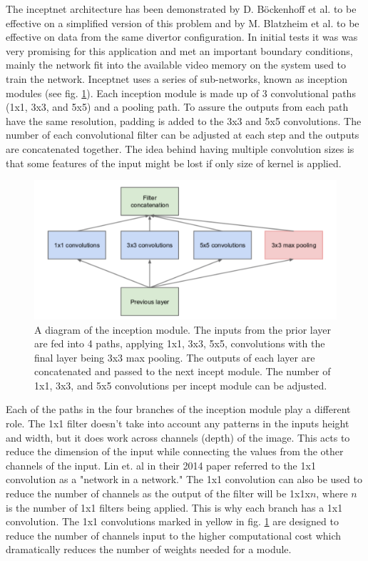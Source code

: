 \label{sec:code:inceptnet}

The inceptnet architecture \cite{https://doi.org/10.48550/arxiv.1409.4842} has been demonstrated by D. Böckenhoff et al. \cite{Böckenhoff_2019} to be effective on a simplified version of this problem and by M. Blatzheim et al. \cite{Blatzheim_2019} to be effective on data from the same divertor configuration. In initial tests it was was very promising for this application and met an important boundary conditions, mainly the network fit into the available video memory on the system used to train the network. Inceptnet uses a series of sub-networks, known as inception modules (see fig. \ref{fig:code:inceptmodule}). Each inception module is made up of 3 convolutional paths (1x1, 3x3, and 5x5) and a pooling path. To assure the outputs from each path have the same resolution, padding is added to the 3x3 and 5x5 convolutions. The number of each convolutional filter can be adjusted at each step and the outputs are concatenated together. The idea behind having multiple convolution sizes is that some features of the input might be lost if only size of kernel is applied.

\begin{figure}[htb]
    \includegraphics[width=\textwidth]{images/incept-simple.png}
    \caption{A diagram of the inception module. The inputs from the prior layer are fed into 4 paths, applying 1x1, 3x3, 5x5, convolutions with the final layer being 3x3 max pooling. The outputs of each layer are concatenated and passed to the next incept module. The number of 1x1, 3x3, and 5x5 convolutions per incept module can be adjusted.}
    \label{fig:code:inceptmodule}
\end{figure}

Each of the paths in the four branches of the inception module play a different role. The 1x1 filter doesn't take into account any patterns in the inputs height and width, but it does work across channels (depth) of the image. This acts to reduce the dimension of the input while connecting the values from the other channels of the input. Lin et. al in their 2014 paper \cite{https://doi.org/10.48550/arxiv.1312.4400} referred to the 1x1 convolution as a "network in a network." The 1x1 convolution can also be used to reduce the number of channels as the output of the filter will be 1x1x$n$, where $n$ is the number of 1x1 filters being applied. This is why each branch has a 1x1 convolution. The 1x1 convolutions marked in yellow in fig. \ref{fig:code:inceptmodule} are designed to reduce the number of channels input to the higher computational cost which dramatically reduces the number of weights needed for a module.

